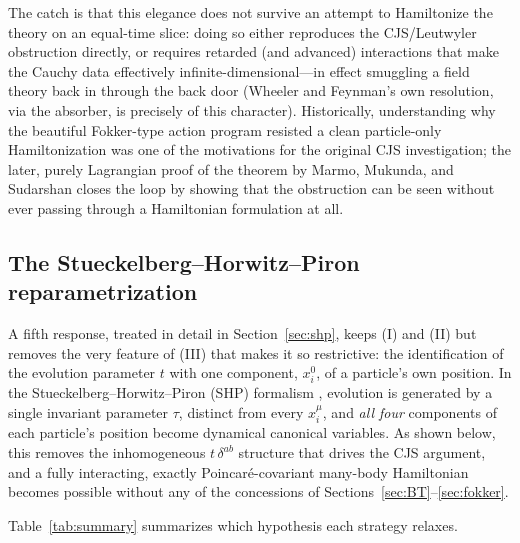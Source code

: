 \documentclass[11pt]{article}
\begin{document}
The catch is that this elegance does not survive an attempt to Hamiltonize the theory on an equal-time slice: doing so either reproduces the CJS/Leutwyler obstruction directly, or requires retarded (and advanced) interactions that make the Cauchy data effectively infinite-dimensional---in effect smuggling a field theory back in through the back door (Wheeler and Feynman's own resolution, via the absorber, is precisely of this character). Historically, understanding why the beautiful Fokker-type action program resisted a clean particle-only Hamiltonization was one of the motivations for the original CJS investigation; the later, purely Lagrangian proof of the theorem by Marmo, Mukunda, and Sudarshan \cite{MMS1984} closes the loop by showing that the obstruction can be seen without ever passing through a Hamiltonian formulation at all.

\subsection{The Stueckelberg--Horwitz--Piron reparametrization}
\label{sec:shp-intro}

A fifth response, treated in detail in Section~\ref{sec:shp}, keeps (I) and (II) but removes the very feature of (III) that makes it so restrictive: the identification of the evolution parameter $t$ with one component, $x_i^0$, of a particle's own position. In the Stueckelberg--Horwitz--Piron (SHP) formalism \cite{Stueckelberg1941,HorwitzPiron1973,Horwitz2015}, evolution is generated by a single invariant parameter $\tau$, distinct from every $x_i^\mu$, and \emph{all four} components of each particle's position become dynamical canonical variables. As shown below, this removes the inhomogeneous $t\,\delta^{ab}$ structure that drives the CJS argument, and a fully interacting, exactly Poincar\'e-covariant many-body Hamiltonian becomes possible without any of the concessions of Sections~\ref{sec:BT}--\ref{sec:fokker}.

\bigskip
\noindent Table~\ref{tab:summary} summarizes which hypothesis each strategy relaxes.
\end{document}
